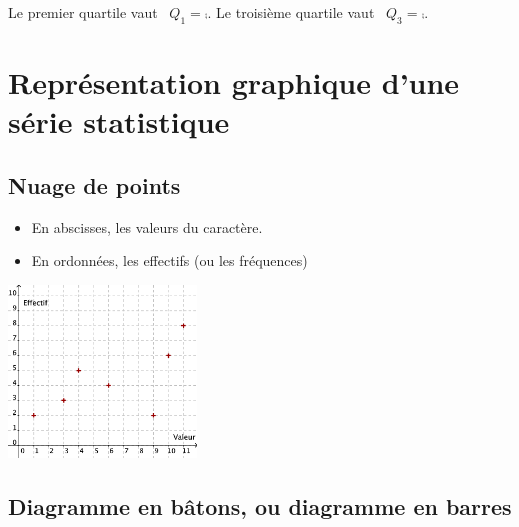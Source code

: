 Le premier quartile vaut \ $Q_1=\comp$. Le troisième quartile vaut \ $Q_3=\comp$. 



\clearpage



\section{Représentation graphique d'une série statistique}


\begin{multicols}{2}
\subsection{Nuage de points}
  \begin{itemize}
  \item En abscisses, les valeurs du caractère.
  \item En ordonnées, les effectifs (ou les fréquences)
  \end{itemize}
  \columnbreak
  \includegraphics[width=5cm]{Stats_Fig4_Nuage}      
\end{multicols}



\subsection{Diagramme en bâtons, ou diagramme en barres}



